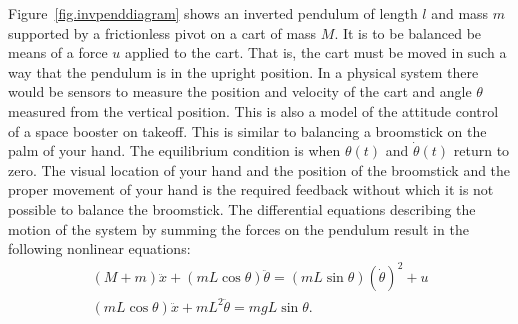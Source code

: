 Figure~\ref{fig.invpenddiagram} shows an inverted pendulum of length $l$ and mass $m$ supported by a frictionless pivot on a cart of mass $M$.  It is to be balanced be means of a force $u$ applied to the cart.  That is, the cart must be moved in such a way that the pendulum is in the upright position.  In a physical system there would be sensors to measure the position and velocity of the cart and angle $\theta$ measured from the vertical position.  This is also a model of the attitude control of a space booster on takeoff.  This is similar to balancing a broomstick on the palm of your hand.  The equilibrium condition is when $\theta(t)$ and $\dot{\theta}(t)$ return to zero.  The visual location of your hand and the position of the broomstick and the proper movement of your hand is the required feedback without which it is not possible to balance the broomstick.  The differential equations describing the motion of the system by summing the forces on the pendulum result in the following nonlinear equations:
\begin{subequations}    \label{eq.invpendnonlineardiffeq}
    \begin{gather}
        (M+m)\ddot{x} + (mL\cos\theta)\ddot{\theta} = (mL\sin\theta)(\dot{\theta})^2 + u \\
        (mL\cos\theta)\ddot{x} + mL^2\ddot{\theta} = mgL\sin\theta .
    \end{gather}
\end{subequations}

